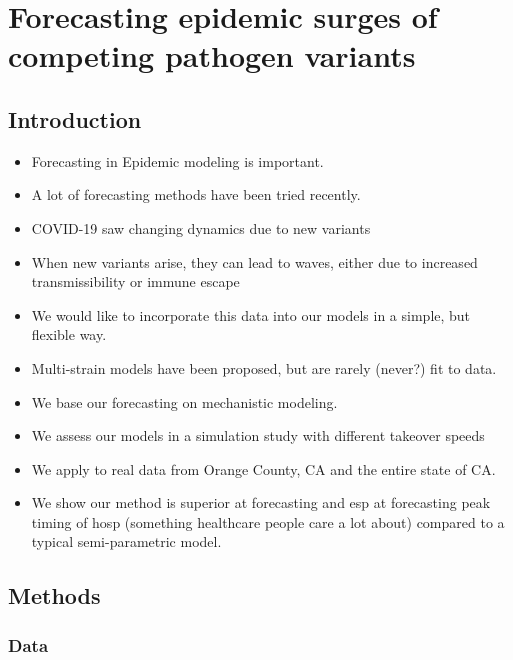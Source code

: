 \chapter{Forecasting epidemic surges of competing pathogen variants}
\graphicspath{{figures/ch_5/}}
\label{ch:content_3}

\section{Introduction}
\label{ch_5:sec:intro}

\begin{itemize}
    \item Forecasting in Epidemic modeling is important.
    \item A lot of forecasting methods have been tried recently.
    \item COVID-19 saw changing dynamics due to new variants
    \item When new variants arise, they can lead to waves, either due to increased transmissibility or immune escape
    \item We would like to incorporate this data into our models in a simple, but flexible way.
    \item Multi-strain models have been proposed, but are rarely (never?) fit to data.
    \item We base our forecasting on mechanistic modeling.
    \item We assess our models in a simulation study with different takeover speeds
    \item We apply to real data from Orange County, CA and the entire state of CA.
    \item We show our method is superior at forecasting and esp at forecasting peak timing of hosp (something healthcare people care a lot about) compared to a typical semi-parametric model.
\end{itemize}

\section{Methods}
\label{ch_5:sec:methods}

\subsection{Data}
\label{ch_5:subsec:data}

